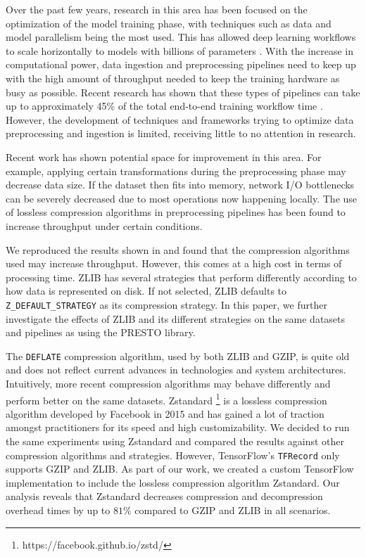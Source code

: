 \documentclass[sigconf,nonacm]{acmart}
\begin{document}
Over the past few years, research in this area has been focused on the optimization of the model training phase, with techniques such as data and model parallelism being the most used.
This has allowed deep learning workflows to scale horizontally to models with billions of parameters \cite{smith2022deepspeed}.
With the increase in computational power, data ingestion and preprocessing pipelines need to keep up with the high amount of throughput needed to keep the training hardware as busy as possible.
Recent research has shown that these types of pipelines can take up to approximately 45\% of the total end-to-end training workflow time \cite{xin2021productionml}.
However, the development of techniques and frameworks trying to optimize data preprocessing and ingestion is limited, receiving little to no attention in research.

Recent work \cite{isenko2022bottleneck} has shown potential space for improvement in this area.
For example, applying certain transformations during the preprocessing phase may decrease data size.
If the dataset then fits into memory, network I/O bottlenecks can be severely decreased due to most operations now happening locally.
The use of lossless compression algorithms in preprocessing pipelines has been found to increase throughput under certain conditions.

We reproduced the results shown in \cite{isenko2022bottleneck} and found that the compression algorithms used may increase throughput.
However, this comes at a high cost in terms of processing time.
ZLIB has several strategies that perform differently according to how data is represented on disk.
If not selected, ZLIB defaults to \texttt{Z\_DEFAULT\_STRATEGY} as its compression strategy.
In this paper, we further investigate the effects of ZLIB and its different strategies on the same datasets and pipelines as \cite{isenko2022bottleneck} using the PRESTO library.

The \texttt{DEFLATE} compression algorithm, used by both ZLIB and GZIP, is quite old and does not reflect current advances in technologies and system architectures.
Intuitively, more recent compression algorithms may behave differently and perform better on the same datasets.
Zstandard \footnote{https://facebook.github.io/zstd/} is a lossless compression algorithm developed by Facebook in 2015 and has gained a lot of traction amongst practitioners for its speed and high customizability.
We decided to run the same experiments using Zstandard and compared the results against other compression algorithms and strategies.
However, TensorFlow's \texttt{TFRecord} only supports GZIP and ZLIB.
As part of our work, we created a custom TensorFlow implementation to include the lossless compression algorithm Zstandard.
Our analysis reveals that Zstandard decreases compression and decompression overhead times by up to $81\%$ compared to GZIP and ZLIB in all scenarios.
\end{document}
